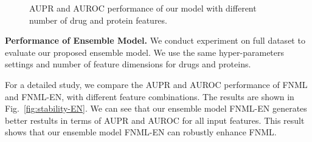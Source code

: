 \documentclass[conference]{IEEEtran}
\begin{document}
\begin{figure}[!ht]
\centering
{}
\vspace*{-10pt}
\caption{AUPR and AUROC performance of our model with different number of drug and protein features.}\label{fig:parameter}
\end{figure}

\textbf{Performance of Ensemble Model.} 
We conduct experiment on full dataset to evaluate our proposed ensemble model. We use the same hyper-parameters settings and number of feature dimensions for drugs and proteins.

For a detailed study, we compare the AUPR and AUROC performance of FNML and FNML-EN, with different feature combinations. The results are shown in Fig.~\ref{fig:stability-EN}. We can see that our ensemble model FNML-EN generates better restults in terms of AUPR and AUROC for all input features. This result shows that our ensemble model FNML-EN can robustly enhance FNML.
\end{document}
